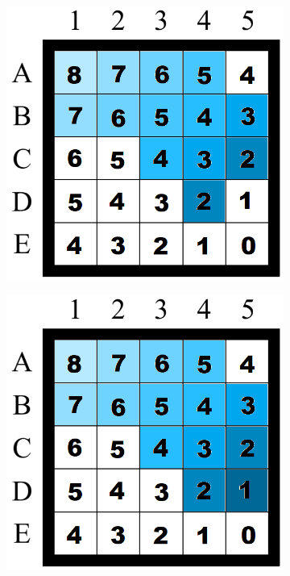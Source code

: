 \begin{figure}[H]
\begin{subfigure}[b]{.3\textwidth}
\end{subfigure}
\newline
\linebreak
\begin{subfigure}[b]{.3\textwidth}
  \centering
  \includegraphics[width=0.95\linewidth]{Report/Part2/g tie breaker/larger g/7.png}  
\end{subfigure}
\begin{subfigure}[b]{.3\textwidth}
  \centering
  \includegraphics[width=0.95\linewidth]{Report/Part2/g tie breaker/larger g/8.png}  

\end{subfigure}
\end{figure}
